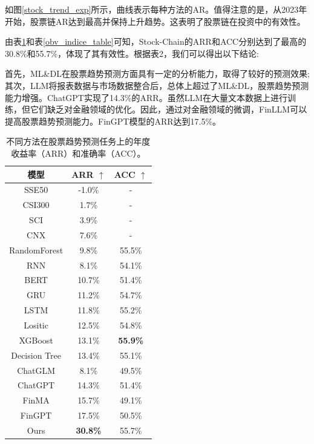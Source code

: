 如图\ref{stock_trend_exp}所示，曲线表示每种方法的AR。值得注意的是，从2023年开始，股票链AR达到最高并保持上升趋势。这表明了股票链在投资中的有效性。

由表\ref{arr_acc_table}和表\ref{obv_indice_table}可知，Stock-Chain的ARR和ACC分别达到了最高的30.8\%和55.7\%，体现了其有效性。根据表2，我们可以得出以下结论: 

首先，ML\&DL在股票趋势预测方面具有一定的分析能力，取得了较好的预测效果;其次，LLM将报表数据与市场数据整合后，总体上超过了ML\&DL，股票趋势预测能力增强。ChatGPT实现了14.3\%的ARR。虽然LLM在大量文本数据上进行训练，但它们缺乏对金融领域的优化。因此，通过对金融领域的微调，FinLLM可以提高股票趋势预测能力。FinGPT模型的ARR达到17.5\%。

\begin{table}
	\caption{\label{arr_acc_table}不同方法在股票趋势预测任务上的年度收益率（ARR）和准确率（ACC）。}
	\centering{}%
	\small 
	\begin{tabular}{ccc}
		\toprule[2pt]
		模型 & ARR $\uparrow$ & ACC $\uparrow$ \\
		\hline
		SSE50 & -1.0\% & - \\
		CSI300 & 1.7\% & - \\
		SCI & 3.9\% & - \\
		CNX & 7.6\% & - \\
		\hline
		RandomForest & 9.8\% & 55.5\% \\
		RNN & 8.1\% & 54.1\% \\
		BERT & 10.7\% & 51.4\% \\
		GRU & 11.2\% & 54.7\% \\
		LSTM & 11.8\% & 55.2\% \\
		Lositic & 12.5\% & 54.8\% \\
		XGBoost & 13.1\% & \textbf{55.9\%} \\
		Decision Tree & 13.4\% & 55.1\% \\
		\hline
		ChatGLM & 8.1\% & 49.5\% \\
		ChatGPT & 14.3\% & 51.4\% \\
		FinMA & 15.7\% & 49.1\% \\
		FinGPT & 17.5\% & 50.5\% \\
		\hline
		Ours & \textbf{30.8\%} & 55.7\% \\
		\bottomrule[2pt]
	\end{tabular}
\end{table}

